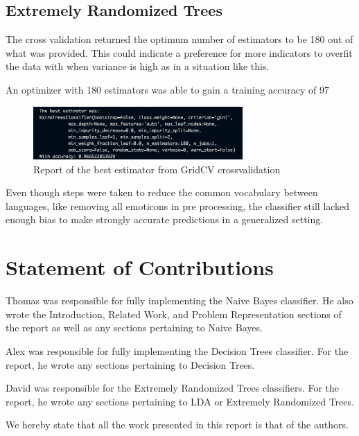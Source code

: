 \documentclass[conference]{IEEEtran}
\begin{document}
\subsection{Extremely Randomized Trees}

The cross validation returned the optimum number of estimators to be 180 out of what was provided. This could indicate a preference for more indicators to overfit the data with when variance is high as in a situation like this. 

An optimizer with 180 estimators was able to gain a training accuracy of 97%

\begin{figure}[htbp]
\centering
\includegraphics[width=80mm]{best_estimator.png}
\caption{Report of the best estimator from GridCV crossvalidation}
\label{confusion_extremely_randomized_trees}
\end{figure}

Even though steps were taken to reduce the common vocabulary between languages, like removing all emoticons in pre processing, the classifier still lacked enough bias to make strongly accurate predictions in a generalized setting.

\section{Statement of Contributions}
Thomas was responsible for fully implementing the Naive Bayes classifier. He also wrote the Introduction, Related Work, and Problem Representation sections of the report as well as any sections pertaining to Naive Bayes.

Alex was responsible for fully implementing the Decision Trees classifier. For the report, he wrote any sections pertaining to Decision Trees.

David was responsible for the Extremely Randomized Trees classifiers. For the report, he wrote any sections pertaining to LDA or Extremely Randomized Trees.

We hereby state that all the work presented in this report is that of the authors.
\end{document}
